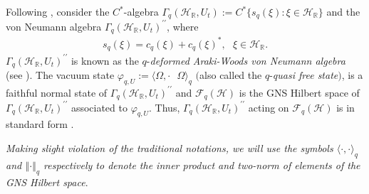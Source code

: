 \documentclass[12pt, a4paper,reqno]{amsart}
\theoremstyle{definition}
\def\R{\mathbb R}
\newcommand{\CF}{\mathcal{F}}
\newcommand{\CH}{\mathcal{H}}
\newcommand{\norm}[1]{\left\Vert#1\right\Vert}
\begin{document}
Following \cite{Hiai, Shlyakhtenko}, consider the $C^*$-algebra 
$\Gamma_q( \CH_\R, U_t) := C^{*}\{ s_q(\xi) : \xi \in \CH_\R \}$ and the von Neumann algebra
$\Gamma_q( \CH_\R, U_t)^{\prime\prime}$, where 
\begin{align*}
s_q(\xi)  = c_q(\xi) + c_q(\xi)^* , \text{ }\xi \in \CH_\R.
\end{align*}  
$\Gamma_q( \CH_\R, U_t)^{\prime\prime}$ is known as the $q$-\textit{deformed Araki-Woods von Neumann algebra}  (see \cite[\S3]{Hiai}).  The vacuum state $\varphi_{q, U}:= 
\langle \Omega, \cdot\text{ } \Omega\rangle_q$ $($also called the $q$-\textit{quasi free state}$)$, is a faithful normal state of $\Gamma_q( \CH_\R, U_t)^{\prime\prime}$ and $\CF_{q}(\CH)$ is the GNS Hilbert space of $\Gamma_q( \CH_\R, U_t)^{\prime\prime}$ associated to $\varphi_{q,U}$. Thus, $\Gamma_q( \CH_\R, U_t)^{\prime\prime}$ acting on $\CF_{q}(\CH)$ is in standard form \cite{Hag75}.  

\textit{Making slight violation of the traditional notations, we will use the symbols $\langle \cdot,\cdot\rangle_q$ and $\norm{\cdot}_{q}$ respectively to denote the inner product and two-norm of elements of the GNS Hilbert space}.
\end{document}
